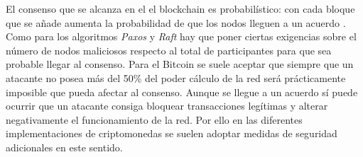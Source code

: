 El consenso que se alcanza en el el blockchain es probabilístico: con cada bloque que se añade aumenta la probabilidad de que los nodos lleguen a un acuerdo \citep{blockchain_consensus}. Como para los algoritmos \textit{Paxos} y \textit{Raft} hay que poner ciertas exigencias sobre el número de nodos maliciosos respecto al total de participantes para que sea probable llegar al consenso. Para el Bitcoin se suele aceptar que siempre que un atacante no posea más del 50\% del poder cálculo de la red será prácticamente imposible que pueda afectar al consenso. Aunque se llegue a un acuerdo sí puede ocurrir que un atacante consiga bloquear transacciones legítimas y alterar negativamente el funcionamiento de la red. Por ello en las diferentes implementaciones de criptomonedas se suelen adoptar medidas de seguridad adicionales en este sentido.
 




